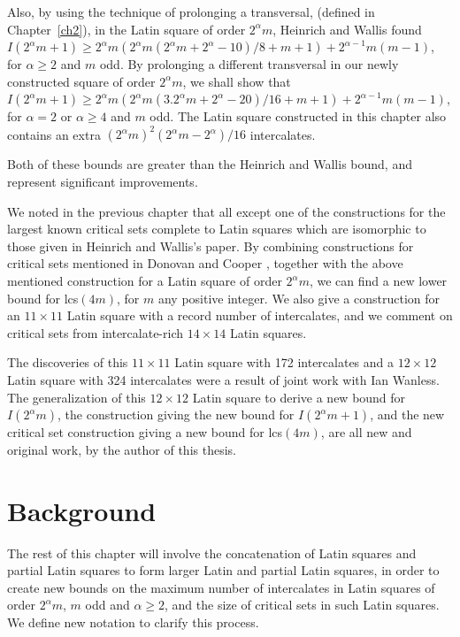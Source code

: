 \documentclass[12pt]{report}
\def\lcs#1{{\rm lcs}$(#1)$}
\begin{document}
Also, by using the technique of prolonging a transversal, (defined
in Chapter~\ref{ch2}), in the
Latin square of order $2^\alpha m$, Heinrich and Wallis found
$I(2^\alpha m+1) \geq 2^\alpha m ( 2^\alpha m (2^\alpha m + 2^\alpha -
10) / 8 + m + 1 ) + 2^{\alpha-1} m(m-1)$, for $\alpha \geq 2$ and $m$ odd.
By prolonging a different transversal in our newly constructed square of order
$2^\alpha m$, we shall show that $I(2^\alpha m + 1) \geq 2^\alpha m (
2^\alpha m (3.2^\alpha m+2^\alpha - 20)/16 + m + 1 ) + 2^{\alpha-1}
m(m-1)$, for $\alpha = 2$ or $\alpha \geq 4$ and $m$ odd.
The Latin square constructed in this chapter also contains an extra $(2^\alpha m)^2 (2^\alpha m - 2^\alpha)/16$
intercalates.

Both of these bounds are greater than the Heinrich and Wallis bound, and 
represent significant improvements.

We noted in the previous chapter that all except one of the constructions
for the largest known critical sets complete to Latin squares which
are isomorphic to those given in Heinrich and Wallis's paper.  By
combining constructions for critical sets mentioned in 
Donovan and Cooper \cite{MR97g:05032}, together with
the above mentioned construction for a Latin square of order $2^\alpha m$,
we can find a new lower bound for \lcs{4m}, for $m$
any positive integer.  We also give a construction for an $11 \times 11$
Latin square with a record number of intercalates, and we comment
on critical sets from intercalate-rich $14 \times 14$ Latin squares.

The discoveries of this $11 \times 11$ Latin square with 172 intercalates
and a $12 \times 12$
Latin square with 324 intercalates were
a result of joint work with Ian Wanless.  The generalization of
this $12 \times 12$ Latin square to derive a new bound for $I(2^\alpha m)$,
the construction giving the new bound for $I(2^\alpha m+1)$, and the new
critical set construction giving a new bound for \lcs{4m}, are all
new and original work, by the author of this thesis.

\section{Background}\label{sec51}
The rest of this chapter will involve the concatenation of Latin squares
and partial Latin squares to form larger Latin and partial Latin squares,
in order to create new bounds on the maximum number of intercalates
in Latin squares of order $2^\alpha m$, $m$ odd and $\alpha \geq 2$, and the size of critical
sets in such Latin squares.  We define new notation to clarify this process.  
\end{document}
